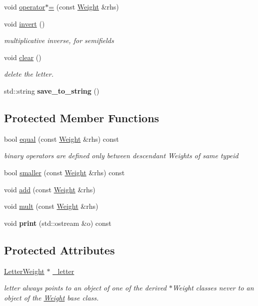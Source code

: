 \begin{DoxyCompactItemize}
void \mbox{\hyperlink{classWeight_a4968f430abd50a0eaea15d01422ef0bb}{operator$\ast$=}} (const \mbox{\hyperlink{classWeight}{Weight}} \&rhs)
\item 
void \mbox{\hyperlink{group__weight_gabc3309e134f0fdda38ebbcb12d350a28}{invert}} ()
\begin{DoxyCompactList}\small\item\em multiplicative inverse, for semifields \end{DoxyCompactList}\item 
void \mbox{\hyperlink{group__weight_gaace5b230ea1544aac7b049091e142bd3}{clear}} ()
\begin{DoxyCompactList}\small\item\em delete the letter. \end{DoxyCompactList}\item 
std\+::string {\bfseries save\+\_\+to\+\_\+string} ()
\end{DoxyCompactItemize}
\subsection*{Protected Member Functions}
\begin{DoxyCompactItemize}
\item 
bool \mbox{\hyperlink{group__weight_ga11236e38c2dc7cc66a367c2ea5921c1e}{equal}} (const \mbox{\hyperlink{classWeight}{Weight}} \&rhs) const
\begin{DoxyCompactList}\small\item\em binary operators are defined only between descendant Weights of same typeid \end{DoxyCompactList}\item 
bool \mbox{\hyperlink{group__weight_gab3a3a5fb989514e5673582b9a7107d97}{smaller}} (const \mbox{\hyperlink{classWeight}{Weight}} \&rhs) const
\item 
void \mbox{\hyperlink{group__weight_ga261db18abff49cac38bd02b8f7af94db}{add}} (const \mbox{\hyperlink{classWeight}{Weight}} \&rhs)
\item 
void \mbox{\hyperlink{group__weight_ga7188f571e507d7f31b76de7faebdb78f}{mult}} (const \mbox{\hyperlink{classWeight}{Weight}} \&rhs)
\item 
void {\bfseries print} (std\+::ostream \&o) const
\end{DoxyCompactItemize}
\subsection*{Protected Attributes}
\begin{DoxyCompactItemize}
\item 
\mbox{\label{classWeight_a01c1d2af2914d5429696a79f891318ea}} 
\mbox{\hyperlink{classLetterWeight}{Letter\+Weight}} $\ast$ \mbox{\hyperlink{classWeight_a01c1d2af2914d5429696a79f891318ea}{\+\_\+letter}}
\begin{DoxyCompactList}\small\item\em letter always points to an object of one of the derived $\ast$\+Weight classes never to an object of the \mbox{\hyperlink{classWeight}{Weight}} base class. \end{DoxyCompactList}\end{DoxyCompactItemize}
